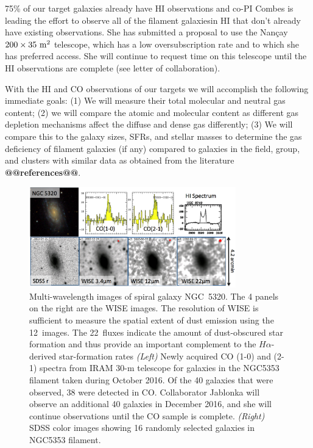 \documentclass[11pt, preprint]{aastex}
\newcommand{\ha}{$H\alpha$}
\begin{document}
75\% of our target galaxies already have HI observations and co-PI Combes is leading the effort to observe all of the filament galaxiesin HI that don't already have existing observations.  She has submitted a proposal to use the Nan\c{c}ay $\rm 200 \times 35~m^2$ telescope, which has a low oversubscription rate and to which she has preferred access.  She will continue to request time on this telescope until the HI observations are complete (see letter of collaboration).

With the HI and CO observations of our targets we will accomplish the following immediate goals: 
(1) We will measure their total molecular and neutral gas content; (2) we will compare the atomic and molecular content as different gas depletion mechanisms affect the diffuse and dense gas differently; (3) We will compare this to the galaxy sizes, SFRs, and stellar masses to determine the gas deficiency of filament galaxies (if any) compared to galaxies in the field, group, and clusters with similar data as obtained from the literature \textbf{@@references@@}.

\begin{figure}[h]
\centering
\includegraphics[width=0.8\textwidth]{NGC5320multiwave.png}
\caption{\small 
Multi-wavelength images of spiral galaxy NGC~5320.  The 
  4 panels on the right are the WISE images. The resolution of WISE is
sufficient to measure the spatial extent of dust emission using the
12\micron \ images.  The 22\micron \ fluxes indicate the amount of
dust-obscured star formation and thus provide an important complement
to the \ha-derived star-formation rates
{\it (Left)} Newly acquired
  CO (1-0) and (2-1) spectra
  from IRAM 30-m telescope for galaxies in the NGC5353 filament taken
  during October 2016.  Of the 40 galaxies that were observed, 38 were
detected in CO.  Collaborator Jablonka will observe an additional 40
galaxies in December 2016, and she will continue observations until
the CO sample is complete.
{\it (Right)} SDSS color images showing 16 randomly
  selected galaxies in NGC5353 filament.  
}
\label{sdssCO}
\end{figure}
\end{document}
